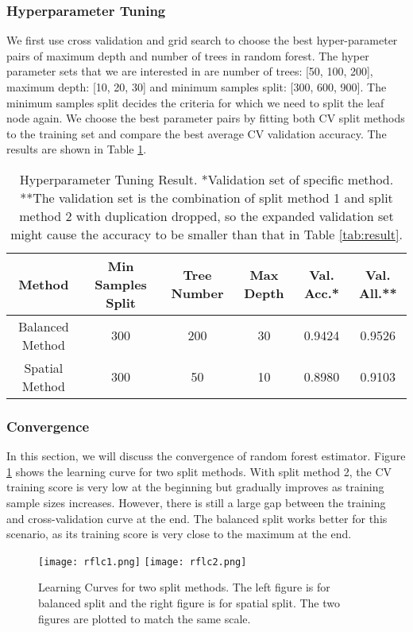 \documentclass[letterpaper,11pt]{article}
\begin{document}
\subsubsection{Hyperparameter Tuning}
We first use cross validation and grid search to choose the best hyper-parameter pairs of maximum depth and number of trees in random forest. The hyper parameter sets that we are interested in are number of trees: [50, 100, 200], maximum depth: [10, 20, 30] and minimum samples split: [300, 600, 900]. The minimum samples split decides the criteria for which we need to split the leaf node again. We choose the best parameter pairs by fitting both CV split methods to the training set and compare the best average CV validation accuracy. The results are shown in Table \ref{tab:ptr}.
\begin{table}[!hbt]
    \centering
    \begin{tabular}{|c|c|c|c|c|c|} \hline
         Method & Min Samples Split & Tree Number & Max Depth  & Val. Acc.* & Val. All.**\\\hline
         Balanced Method & 300 & 200 & 30 & 0.9424 & 0.9526 \\         
         Spatial Method & 300 & 50 & 10 & 0.8980 & 0.9103 \\ \hline
    \end{tabular}
    \caption{Hyperparameter Tuning Result. *Validation set of specific method. **The validation set is the combination of split method 1 and split method 2 with duplication dropped, so the expanded validation set might cause the accuracy to be smaller than that in Table \ref{tab:result}.}
    \label{tab:ptr}
\end{table}

\subsubsection{Convergence}
In this section, we will discuss the convergence of random forest estimator. Figure \ref{fig:rflc} shows the learning curve for two split methods. With split method 2, the CV training score is very low at the beginning but gradually improves as training sample sizes increases. However, there is still a large gap between the training and cross-validation curve at the end. The balanced split works better for this scenario, as its training score is very close to the maximum at the end.

\begin{figure}[!hbt]
    \centering
    \texttt{[image: rflc1.png]}
    \texttt{[image: rflc2.png]}
    \caption{Learning Curves for two split methods. The left figure is for balanced split and the right figure is for spatial split. The two figures are plotted to match the same scale.}
    \label{fig:rflc}
\end{figure}
\end{document}
